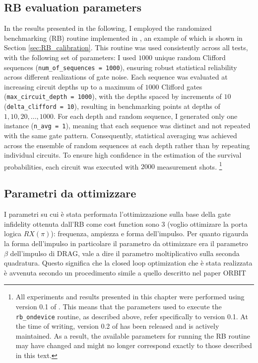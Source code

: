 \subsection{RB evaluation parameters}
In the results presented in the following, I employed the randomized benchmarking (RB) routine implemented in \Qibocal, an example of which is shown in Section \ref{sec:RB_calibration}. 
This routine was used consistently across all tests, with the following set of parameters: I used $1000$ unique random Clifford sequences (\texttt{num\_of\_sequences = 1000}), ensuring robust statistical reliability across different realizations of gate noise. 
Each sequence was evaluated at increasing circuit depths up to a maximum of $1000$ Clifford gates (\texttt{max\_circuit\_depth = 1000}), with the depths spaced by increments of $10$ (\texttt{delta\_clifford = 10}), resulting in benchmarking points at depths of $1, 10, 20, \ldots, 1000$. 
For each depth and random sequence, I generated only one instance (\texttt{n\_avg = 1}), meaning that each sequence was distinct and not repeated with the same gate pattern. 
Consequently, statistical averaging was achieved across the ensemble of random sequences at each depth rather than by repeating individual circuits. 
To ensure high confidence in the estimation of the survival probabilities, each circuit was executed with $2000$ measurement shots. %
\footnote{All experiments and results presented in this chapter were performed using version 0.1 of \Qibocal. This means that the parameters used to execute the \texttt{rb\_ondevice} routine, as described above, refer specifically to version 0.1. At the time of writing, version 0.2 of \Qibocal has been released and is actively maintained. As a result, the available parameters for running the RB routine may have changed and might no longer correspond exactly to those described in this text.}

\subsection{Parametri da ottimizzare}
I parametri su cui è stata performata l'ottimizzazione sulla base della gate infidelity ottenuta dall'RB come cost function sono 3 (voglio ottimizare la porta logica $RX(\pi)$): frequenza, ampiezza e forma dell'impulso.
Per quanto rigaurda la forma dell'impulso in particolare il parametro da ottimizzare era il parametro $\beta$ dell'impulso di DRAG, vale a dire il parametro moltiplicativo sulla seconda quadratura.
Questo significa che la closed loop optimization che è stata realizzata è avvenuta secondo un procedimento simile a quello descritto nel paper ORBIT \cite{kelly_optimal_2014}

